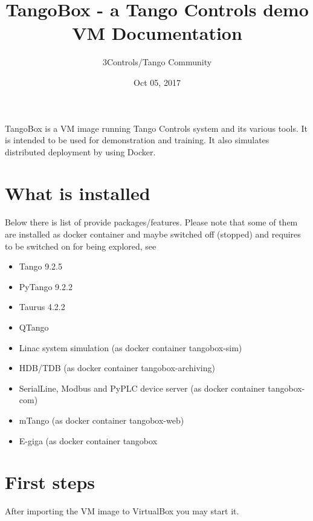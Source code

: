 \documentclass[letterpaper,10pt,english]{sphinxmanual}
\title{TangoBox - a Tango Controls demo VM Documentation}
\date{Oct 05, 2017}
\author{3Controls/Tango Community}
\begin{document}
\maketitle
\sphinxtableofcontents
{}\label{\detokenize{index::doc}}


TangoBox is a VM image running Tango Controls system and its various tools.
It is intended to be used for demonstration and training.
It also simulates distributed deployment by using Docker.


\chapter{What is installed}
\label{\detokenize{index:welcome-to-tangobox-a-tango-controls-demo-vm-s-documentation}}\label{\detokenize{index:what-is-installed}}
Below there is list of provide packages/features. Please note that some of them
are installed as docker container and maybe switched off (stopped) and requires to be switched
on for being explored, see {\hyperref[\detokenize{index:container-switch-on-off}]{}}
\begin{itemize}
\item {} 
Tango 9.2.5

\item {} 
PyTango 9.2.2

\item {} 
Taurus 4.2.2

\item {} 
QTango

\item {} 
Linac system simulation (as docker container tangobox-sim)

\item {} 
HDB/TDB (as docker container tangobox-archiving)

\item {} 
SerialLine, Modbus and PyPLC device server (as docker container tangobox-com)

\item {} 
mTango (as docker container tangobox-web)

\item {} 
E-giga (as docker container tangobox

\end{itemize}


\chapter{First steps}
\label{\detokenize{index:first-steps}}
After importing the VM image to VirtualBox you may start it.
\end{document}
